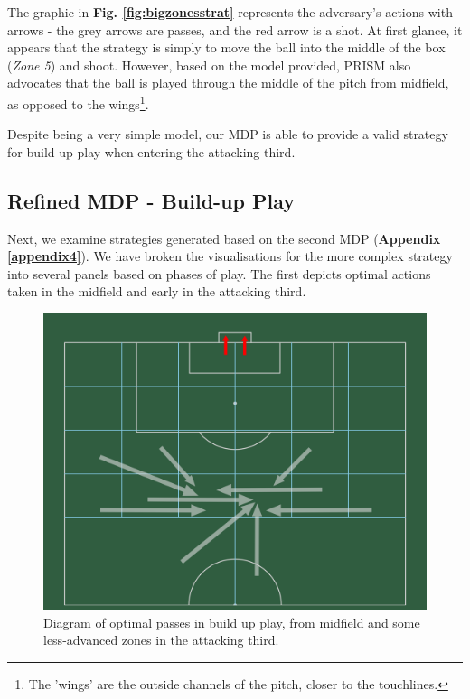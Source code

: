 \documentclass{l4proj}
\begin{document}
The graphic in \textbf{Fig. \ref{fig:bigzonesstrat}} represents the adversary's actions with arrows - the grey arrows are passes, and the red arrow is a shot. At first glance, it appears that the strategy is simply to move the ball into the middle of the box (\textit{Zone 5}) and shoot. However, based on the model provided, PRISM also advocates that the ball is played through the middle of the pitch from midfield, as opposed to the wings\footnote{The 'wings' are the outside channels of the pitch, closer to the touchlines.}.

Despite being a very simple model, our MDP is able to provide a valid strategy for build-up play when entering the attacking third.

\subsection{Refined MDP - Build-up Play}

Next, we examine strategies generated based on the second MDP (\textbf{Appendix \ref{appendix4}}). We have broken the visualisations for the more complex strategy into several panels based on phases of play. The first depicts optimal actions taken in the midfield and early in the attacking third.

\begin{figure}[h]
    \centering
    \includegraphics[scale=0.1]{images/buildupplay.png}   
    \caption{Diagram of optimal passes in build up play, from midfield and some less-advanced zones in the attacking third.}
    \label{fig:weezonebup} 
\end{figure}
\end{document}
